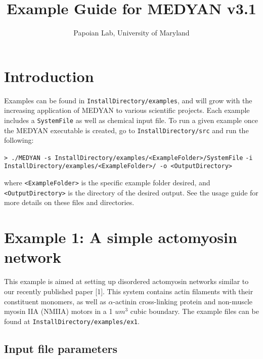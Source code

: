 \documentclass[11pt, oneside]{article}   	%
\title{Example Guide for MEDYAN \textbf{v3.1}}
\author{Papoian Lab, University of Maryland}
\date{}							%
\begin{document}
\maketitle

\tableofcontents
\newpage

\section{Introduction}

Examples can be found in \texttt{InstallDirectory/examples}, and will grow with the increasing application of MEDYAN to various scientific projects. Each example includes a \texttt{SystemFile} as well as chemical input file. To run a given example once the MEDYAN executable is created, go to \texttt{InstallDirectory/src} and run the following:\newline

\indent \texttt{> ./MEDYAN -s InstallDirectory/examples/<ExampleFolder>/SystemFile}\newline
\indent\indent \texttt{-i InstallDirectory/examples/<ExampleFolder>/  -o <OutputDirectory>}\newline

\noindent where \texttt{<ExampleFolder>} is the specific example folder desired, and \texttt{<OutputDirectory>} is the directory of the desired output. See the usage guide for more details on these files and directories.

\section{Example 1: A simple actomyosin network}

This example is aimed at setting up disordered actomyosin networks similar to our recently published paper [1]. This system contains actin filaments with their constituent monomers, as well as $\alpha$-actinin cross-linking protein and non-muscle myosin IIA (NMIIA) motors in a 1 $um^3$ cubic boundary. The example files can be found at \texttt{InstallDirectory/examples/ex1}.

\subsection{Input file parameters}
\end{document}
